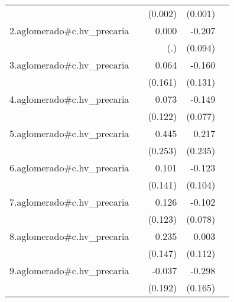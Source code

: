{\begin{longtable}{l*{4}{D{.}{.}{-1}}}
            &                     &     (0.002)         &     (0.001)         &                     \\
\addlinespace
2.aglomerado#c.hv\_precaria&                     &       0.000         &      -0.207\sym{*}  &                     \\
            &                     &         (.)         &     (0.094)         &                     \\
\addlinespace
3.aglomerado#c.hv\_precaria&                     &       0.064         &      -0.160         &                     \\
            &                     &     (0.161)         &     (0.131)         &                     \\
\addlinespace
4.aglomerado#c.hv\_precaria&                     &       0.073         &      -0.149         &                     \\
            &                     &     (0.122)         &     (0.077)         &                     \\
\addlinespace
5.aglomerado#c.hv\_precaria&                     &       0.445         &       0.217         &                     \\
            &                     &     (0.253)         &     (0.235)         &                     \\
\addlinespace
6.aglomerado#c.hv\_precaria&                     &       0.101         &      -0.123         &                     \\
            &                     &     (0.141)         &     (0.104)         &                     \\
\addlinespace
7.aglomerado#c.hv\_precaria&                     &       0.126         &      -0.102         &                     \\
            &                     &     (0.123)         &     (0.078)         &                     \\
\addlinespace
8.aglomerado#c.hv\_precaria&                     &       0.235         &       0.003         &                     \\
            &                     &     (0.147)         &     (0.112)         &                     \\
\addlinespace
9.aglomerado#c.hv\_precaria&                     &      -0.037         &      -0.298         &                     \\
            &                     &     (0.192)         &     (0.165)         &                     \\

\end{longtable}}
